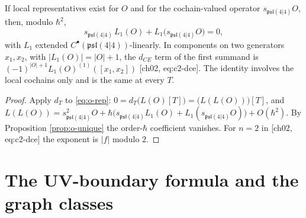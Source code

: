 \begin{theorem}
\label{thm:o-cocycle}
If local representatives exist for $O$ and for the cochain-valued operator $s_{\mathfrak{psl}(4|4)}O$, then, modulo $\hbar^2$,
\begin{equation}
s_{\mathfrak{psl}(4|4)}\,L_1(O)+L_1\big(s_{\mathfrak{psl}(4|4)}O\big)=0 ,
\label{eq:o-cocycle}
\end{equation}
with $L_1$ extended $C^\bullet(\mathfrak{psl}(4|4))$-linearly. In components on two generators $x_1,x_2$, with $|L_1(O)|=|O|+1$, the $d_{CE}$ term of the first summand is $(-1)^{|O|+1}L_1(O)^{(1)}([x_1,x_2])$ [ch02, eq:c2-dce]. The identity involves the local cochains only and is the same at every $T$.
\end{theorem}

\begin{proof}
Apply $d_T$ to \eqref{eq:o-rep}: $0=d_T\big(L(O)[T]\big)=\big(L(L(O))\big)[T]$, and $L(L(O))=s_{\mathfrak{psl}(4|4)}^2O+\hbar\big(s_{\mathfrak{psl}(4|4)}L_1(O)+L_1(s_{\mathfrak{psl}(4|4)}O)\big)+O(\hbar^2)$. By Proposition \ref{prop:o-unique} the order-$\hbar$ coefficient vanishes. For $n=2$ in [ch02, eq:c2-dce] the exponent is $|f|$ modulo $2$.
\end{proof}

\section{The UV-boundary formula and the graph classes}

